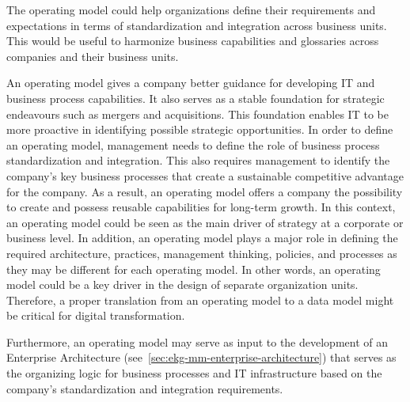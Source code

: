 %
%
The operating model could help organizations define their requirements
and expectations in terms of standardization and integration across business units.
This would be useful to harmonize business capabilities and glossaries
across companies and their business units.

An operating model gives a company better guidance for developing IT and business process capabilities.
It also serves as a stable foundation for strategic endeavours such as mergers and acquisitions.
This foundation enables IT to be more proactive in identifying possible strategic opportunities.
In order to define an operating model, management needs to define the role of business process
standardization and integration.
This also requires management to identify the company’s key business processes that create a sustainable
competitive advantage for the company.
As a result, an operating model offers a company the possibility to create and possess reusable capabilities
for long-term growth.
In this context, an operating model could be seen as the main driver of strategy at a corporate or business level.
In addition, an operating model plays a major role in defining the required architecture, practices,
management thinking, policies, and processes as they may be different for each operating model.
In other words, an operating model could be a key driver in the design of separate organization units.
Therefore, a proper translation from an operating model to a data model might be critical for digital transformation.

Furthermore, an operating model may serve as input to the development of an Enterprise Architecture
(see~\ref{sec:ekg-mm-enterprise-architecture}) that serves as the organizing logic for business processes
and IT infrastructure based on the company’s standardization and integration requirements.

